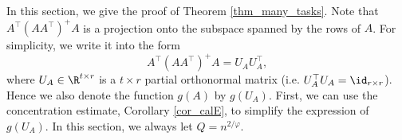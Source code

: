 \documentclass[aos,preprint]{imsart}
\begin{document}
\iffalse  
For the optimization objective $f(A,B)$ in \eqref{eq_mtl_same_cov}, using the local optimality condition over $B$, that is, $\frac{\partial f}{\partial B} = 0$, we obtain $\hat{B}$ as a function of $A$:
	\begin{align}
		\hat{B}(A) &\define (X^{\top}X)^{-1} X^{\top} \bigbrace{\sum_{j=1}^t Y^{(j)} A_j^{\top}} (A  A^{\top})^{+} \nonumber \\
		&= (X^{\top} X)^{-1} X^{\top} Y A^{\top} (AA^{\top})^{+}, \label{eq_Bhat}
	\end{align}
	where $Y := [Y^{(1)}, Y^{(2)}, \dots, Y^{(t)}]$ and $(AA^{\top})^{+}$ denotes the pseudoinverse of $AA^{\top}$.
	Plugging $\hat{B}(A)$ into equation \eqref{eq_mtl_same_cov}, we obtain the following objective that only depends on $A$ (in matrix notation):
	\begin{align}\label{eq_mtl_output_layer}
		g(A) = \bignormFro{X (X^{\top}X)^{-1}X^{\top} Y A^{\top} (AA^{\top})^{+} A - Y}^2.
	\end{align}
	\fi	
	In this section, we give the proof of Theorem \ref{thm_many_tasks}. Note that $A^{\top} (AA^{\top})^{+} A$ is a projection onto the subspace spanned by the rows of $A$. For simplicity, we write it into the form
	$$A^{\top} (AA^{\top})^{+} A= U_A U_A^\top,$$
	where $U_A \in \R^{t\times r}$ is a $t\times r$ partial orthonormal matrix (i.e. $U_A^\top U_A=\id_{r\times r}$). Hence we also denote the function $g(A)$ by $g(U_A)$. 	
	First, we can use the concentration estimate, Corollary \ref{cor_calE}, to simplify the expression of $g(U_A)$.
	 In this section, we always let $Q=n^{2/\varphi}$.
	
% 
\end{document}
